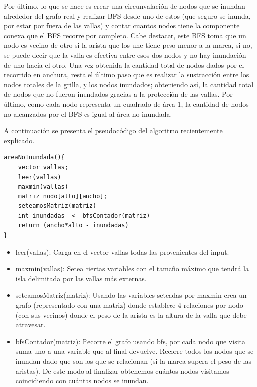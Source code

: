 \documentclass[a4paper, 12pt]{article}
\begin{document}
Por último, lo que se hace es crear una circunvalación de nodos que se inundan alrededor del grafo real y realizar BFS desde uno de estos (que seguro se inunda, por estar por fuera de las vallas) y contar cuantos nodos tiene la componente conexa que el BFS recorre por completo. Cabe destacar, este BFS toma que un nodo es vecino de otro si la arista que los une tiene peso menor a la marea, si no, se puede decir que la valla es efectiva entre esos dos nodos y no hay inundación de uno hacia el otro. Una vez obtenida la cantidad total de nodos dados por el recorrido en anchura, resta el último paso que es realizar la sustracción entre los nodos totales de la grilla, y los nodos inundados; obteniendo así, la cantidad total de nodos que no fueron inundados gracias a la protección de las vallas. Por último, como cada nodo representa un cuadrado de área 1, la cantidad de nodos no alcanzados por el BFS es igual al área no inundada.

A continuación se presenta el pseudocódigo del algoritmo recientemente explicado.

\begin{verbatim}
areaNoInundada(){
	vector vallas;
	leer(vallas)
	maxmin(vallas)
	matriz nodo[alto][ancho];
	seteamosMatriz(matriz)
	int inundadas  <- bfsContador(matriz)
	return (ancho*alto - inundadas)
}
\end{verbatim}



\begin{itemize}
\item leer(vallas): Carga en el vector vallas todas las provenientes del input.

\item maxmin(vallas): Setea ciertas variables con el tama\~no máximo que tendrá la isla delimitada por las vallas más externas.

\item seteamosMatriz(matriz): Usando las variables seteadas por maxmin crea un grafo (representado con una matriz) donde establece 4 relaciones por nodo (con sus vecinos) donde el peso de la arista es la altura de la valla que debe atravesar.

\item bfsContador(matriz): Recorre el grafo usando bfs, por cada nodo que visita suma uno a una variable que al final devuelve. Recorre todos los nodos que se inundan dado que son los que se relacionan (si la marea supera el peso de las aristas). De este modo al finalizar obtenemos cuántos nodos visitamos coincidiendo con cuántos nodos se inundan.
\end{itemize}
\end{document}
